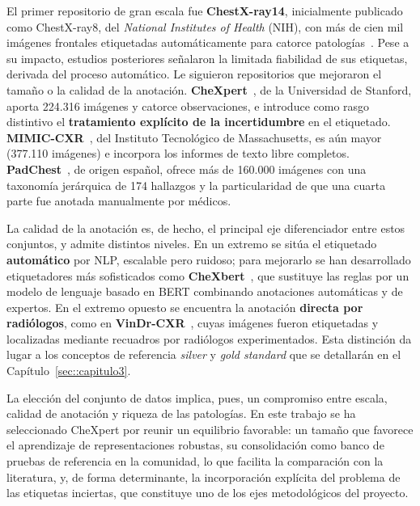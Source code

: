 El primer repositorio de gran escala fue \textbf{ChestX-ray14}, inicialmente
publicado como ChestX-ray8, del \textit{National Institutes of Health} (NIH),
con más de cien mil imágenes frontales etiquetadas automáticamente para catorce
patologías~\cite{wangChestXray8Hospital2017}. Pese a su impacto, estudios
posteriores señalaron la limitada fiabilidad de sus etiquetas, derivada del
proceso automático. Le siguieron repositorios que mejoraron el tamaño o la
calidad de la anotación. \textbf{CheXpert}~\cite{irvinCheXpertLargeChest2019}, de
la Universidad de Stanford, aporta 224.316 imágenes y catorce observaciones, e
introduce como rasgo distintivo el \textbf{tratamiento explícito de la
incertidumbre} en el etiquetado. \textbf{MIMIC-CXR}~\cite{johnsonMIMICCXR2019},
del Instituto Tecnológico de Massachusetts, es aún mayor (377.110 imágenes) e
incorpora los informes de texto libre completos. \textbf{PadChest}~\cite{bustosPadChest2020},
de origen español, ofrece más de 160.000 imágenes con una taxonomía jerárquica de
174 hallazgos y la particularidad de que una cuarta parte fue anotada manualmente
por médicos.

La calidad de la anotación es, de hecho, el principal eje diferenciador entre
estos conjuntos, y admite distintos niveles. En un extremo se sitúa el etiquetado
\textbf{automático} por NLP, escalable pero ruidoso; para mejorarlo se han
desarrollado etiquetadores más sofisticados como
\textbf{CheXbert}~\cite{smitCheXbertCombining2020}, que sustituye las reglas por
un modelo de lenguaje basado en BERT combinando anotaciones automáticas y de
expertos. En el extremo opuesto se encuentra la anotación \textbf{directa por
radiólogos}, como en \textbf{VinDr-CXR}~\cite{nguyenVinDrCXR2022}, cuyas imágenes
fueron etiquetadas y localizadas mediante recuadros por radiólogos
experimentados. Esta distinción da lugar a los conceptos de referencia
\textit{silver} y \textit{gold standard} que se detallarán en el
Capítulo~\ref{sec::capitulo3}.

La elección del conjunto de datos implica, pues, un compromiso entre escala,
calidad de anotación y riqueza de las patologías. En este trabajo se ha
seleccionado CheXpert por reunir un equilibrio favorable: un tamaño que favorece
el aprendizaje de representaciones robustas, su consolidación como banco de
pruebas de referencia en la comunidad, lo que facilita la comparación con la
literatura, y, de forma determinante, la incorporación explícita del problema de
las etiquetas inciertas, que constituye uno de los ejes metodológicos del
proyecto.


